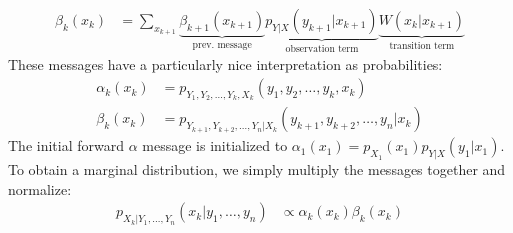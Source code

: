 \documentclass[12pt]{article}
\begin{document}
\begin{itemize}
\begin{align*}
                \beta_{k}(x_{k}) &=
                    \sum_{x_{k+1}}
                        \underbrace{\beta_{k+1}(x_{k+1})}_{\text{prev.\ message}} 
                        \underbrace{p_{Y|X}(y_{k+1}|x_{k+1})}_{\text{observation\ term}} 
                        \underbrace{W(x_{k}| x_{k+1})}_{\text{transition term}}
            \end{align*}
            These messages have a particularly nice interpretation as probabilities:
            \begin{align*}
                \alpha_k(x_k) &= p_{Y_1, Y_2, \ldots, Y_k, X_k}(y_1, y_2, \ldots, y_k, x_k) \\
                \beta_k(x_k) &= p_{Y_{k+1}, Y_{k+2}, \ldots, Y_n| X_k}(y_{k+1}, y_{k+2}, \ldots, y_n | x_k)
            \end{align*}
            The initial forward $\alpha$ message is initialized to $\alpha_1(x_1) = p_{X_1}(x_1)p_{Y|X}(y_1|x_1)$.
            To obtain a marginal distribution, we simply multiply the messages together and
            normalize:
            \begin{align*}
                p_{X_k | Y_1, \ldots, Y_n}(x_k|y_1,\ldots,y_n) &\propto \alpha_{k}(x_{k})\beta_{k}(x_{k})
            \end{align*}
    \end{itemize}
\end{document}
